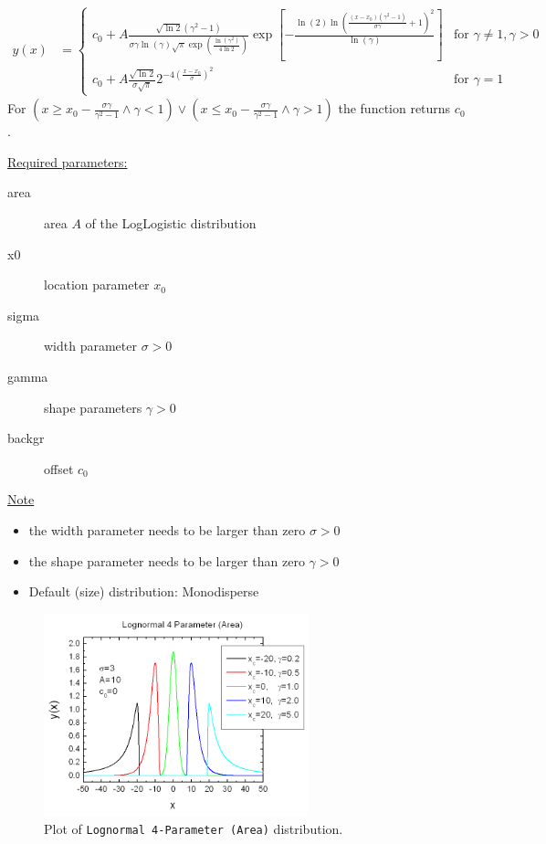 \begin{align}
y(x) & =
\begin{cases}
c_0+A \frac{\sqrt{\ln 2}(\gamma^2-1)}{\sigma\gamma\ln(\gamma)\sqrt{\pi}\exp\left(\frac{\ln(\gamma^2)}{4\ln 2}\right)}
\exp\left[ - \frac{\ln(2)\ln\left(\frac{(x-x_0)(\gamma^2-1)}{\sigma\gamma}+1\right)^2}{\ln(\gamma)}\right] & \mbox{for } \gamma \neq 1, \gamma > 0 \\
c_0+A \frac{\sqrt{\ln 2}}{\sigma\sqrt{\pi}} 2^{-4\left(\frac{x-x_0}{\sigma}\right)^2} & \mbox{for } \gamma = 1
\end{cases}
\end{align}
For $\left(x \geq x_0-\frac{\sigma\gamma}{\gamma^2-1} \wedge \gamma < 1\right)
\vee \left(x \leq x_0-\frac{\sigma\gamma}{\gamma^2-1} \wedge \gamma > 1\right)$ the function returns $c_0$.
\vspace{2mm}

\underline{Required parameters:}
\begin{description}
    \item[area] area $A$ of the LogLogistic distribution
    \item[x0] location parameter $x_0$
    \item[sigma] width parameter $\sigma > 0$
    \item[gamma] shape parameters $\gamma > 0$
    \item[backgr] offset $c_0$
\end{description}

\underline{Note}
\begin{itemize}
  \item the width parameter needs to be larger than zero $\sigma > 0$
  \item the shape parameter needs to be larger than zero $\gamma > 0$
  \item Default (size) distribution: Monodisperse
\end{itemize}


\begin{figure}[htb]
\begin{center}
\includegraphics[width=0.6824\textwidth]{LogNormal4ParameterArea.png}
\end{center}
\caption{Plot of \texttt{Lognormal 4-Parameter (Area)} distribution.}
\label{fig:LogNormal4ParameterArea}
\end{figure}

